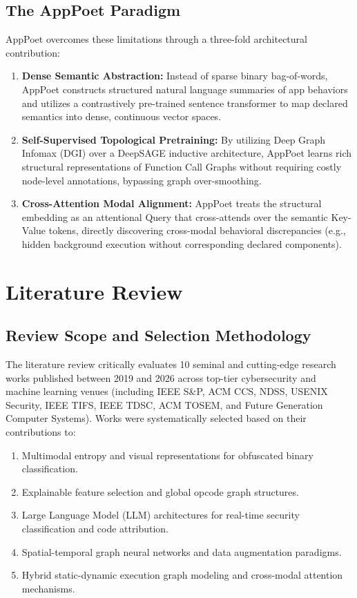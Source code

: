 \documentclass[12pt,a4paper,oneside]{report}
\begin{document}
\section{The AppPoet Paradigm}
AppPoet overcomes these limitations through a three-fold architectural contribution:
\begin{enumerate}
    \item \textbf{Dense Semantic Abstraction:} Instead of sparse binary bag-of-words, AppPoet constructs structured natural language summaries of app behaviors and utilizes a contrastively pre-trained sentence transformer to map declared semantics into dense, continuous vector spaces.
    \item \textbf{Self-Supervised Topological Pretraining:} By utilizing Deep Graph Infomax (DGI) over a DeepSAGE inductive architecture, AppPoet learns rich structural representations of Function Call Graphs without requiring costly node-level annotations, bypassing graph over-smoothing.
    \item \textbf{Cross-Attention Modal Alignment:} AppPoet treats the structural embedding as an attentional Query that cross-attends over the semantic Key-Value tokens, directly discovering cross-modal behavioral discrepancies (e.g., hidden background execution without corresponding declared components).
\end{enumerate}

\clearpage
\chapter{Literature Review}
\section{Review Scope and Selection Methodology}
The literature review critically evaluates 10 seminal and cutting-edge research works published between 2019 and 2026 across top-tier cybersecurity and machine learning venues (including IEEE S\&P, ACM CCS, NDSS, USENIX Security, IEEE TIFS, IEEE TDSC, ACM TOSEM, and Future Generation Computer Systems). Works were systematically selected based on their contributions to:
\begin{enumerate}
    \item Multimodal entropy and visual representations for obfuscated binary classification.
    \item Explainable feature selection and global opcode graph structures.
    \item Large Language Model (LLM) architectures for real-time security classification and code attribution.
    \item Spatial-temporal graph neural networks and data augmentation paradigms.
    \item Hybrid static-dynamic execution graph modeling and cross-modal attention mechanisms.
\end{enumerate}
\end{document}
